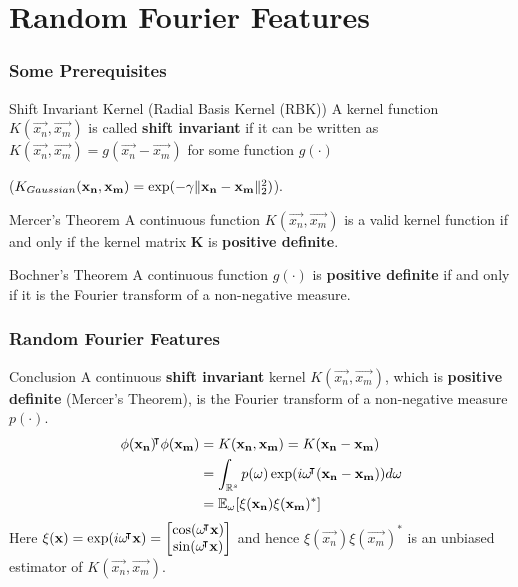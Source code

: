 \documentclass[10pt]{../formats/RU}
\begin{document}
\section{Random Fourier Features}
\begin{frame}
\frametitle{Some Prerequisites}
\begin{alertblock}{Shift Invariant Kernel (Radial Basis Kernel (RBK))}
  A kernel function $K(\vec{x_n}, \vec{x_m})$ is called \textbf{shift invariant} if it can be written as $K(\vec{x_n}, \vec{x_m}) = g(\vec{x_n}-\vec{x_m})$ for some function $g(\cdot)$
  
  (\eg $K_{Gaussian}(\mathbf{x_n},\mathbf{x_m})=\exp(-\gamma\lVert\mathbf{x_n}-\mathbf{x_m}\rVert_2^2)$).
\end{alertblock}
\begin{block}{Mercer’s Theorem}
  A continuous function $K(\vec{x_n}, \vec{x_m})$ is a valid kernel function if and only if the kernel matrix $\mathbf{K}$ is \textbf{positive definite}.
\end{block}
\begin{block}{Bochner's Theorem}
  A continuous function $g(\cdot)$ is \textbf{positive definite} if and only if it is the Fourier transform of a non-negative measure.
\end{block}
\end{frame}
\begin{frame}
  \frametitle{Random Fourier Features}
  \begin{exampleblock}{Conclusion}
    A continuous \textbf{shift invariant} kernel $K(\vec{x_n}, \vec{x_m})$, which is \textbf{positive definite} (Mercer's Theorem), is the Fourier transform of a non-negative measure $p(\cdot)$.
    \begin{align}
      \phi(\vec{x_n})\trn\phi(\vec{x_m})
      &= K(\vec{x_n}, \vec{x_m}) = K(\vec{x_n}-\vec{x_m}) \\
      &=\int_{\R^s}p(\vec{\omega})\exp(i\vec{\omega}\trn(\vec{x_n}-\vec{x_m}))d\vec{\omega} \\
      &= \mathbb{E}_{\vec{\omega}}\bracks*{\xi(\vec{x_n})\xi(\vec{x_m})^*}\label{rffinC}
    \end{align}
    Here 
    $
    \xi(\mathbf{x})=\exp(i\mathbf{\omega}{}^{\mkern-4mu\intercal}\mathbf{x})={
      \begin{bmatrix}
        \cos(\mathbf{\omega}{}^{\mkern-4mu\intercal}\mathbf{x}) \\
        \sin(\mathbf{\omega}{}^{\mkern-4mu\intercal}\mathbf{x})
      \end{bmatrix}
    }
    $ 
    and hence $\xi(\vec{x_n})\xi(\vec{x_m})^*$ is an unbiased estimator of $K(\vec{x_n}, \vec{x_m})$.
  \end{exampleblock}
\end{frame}
\end{document}
